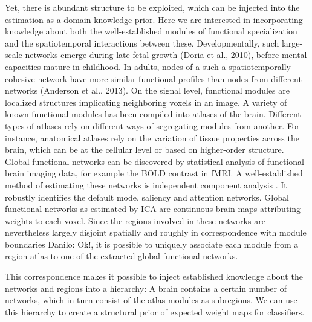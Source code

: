 \documentclass{article} %
\begin{document}
Yet, there is abundant structure to be exploited, which can be
injected into the estimation as a domain knowledge prior. Here we are 
interested in incorporating knowledge about both the well-established 
modules of functional specialization and the spatiotemporal interactions
between these.
%
Developmentally, such large-scale networks emerge during late
fetal growth (Doria et al., 2010), before mental capacities mature
in childhood. 
%
In adults, nodes of a such a spatiotemporally cohesive network have more
similar functional profiles than nodes from different networks
(Anderson et al., 2013).
%
On the signal level, functional modules are localized structures implicating
neighboring voxels in an image. A variety of known functional modules has
been compiled into atlases of the brain. Different types of atlases rely on
different ways of segregating modules from another. For instance, anatomical
atlases rely on the variation of tissue properties across the brain, which
can be at the cellular level or based on higher-order structure.
%
Global functional networks can be discovered by statistical analysis of
functional brain imaging data, for example the BOLD contrast in fMRI. A
well-established method of estimating these networks is independent 
component analysis \cite{Hamalainen}. It robustly identifies the default
mode, saliency and attention networks.
%
Global functional networks as estimated by ICA are continuous brain maps
attributing weights to each voxel. Since the regions involved in these
networks are nevertheless largely disjoint spatially and roughly in
correspondence with module boundaries {\color{red} Danilo: Ok!}, 
it is possible to uniquely associate each module from a region atlas to one
of the extracted global functional networks.

This correspondence makes it possible to inject established knowledge about the 
networks and regions into a hierarchy: A brain contains a certain number of
networks, which in turn consist of the atlas modules as subregions.
We can use this hierarchy to create a structural prior of expected weight
maps for classifiers.
\end{document}
